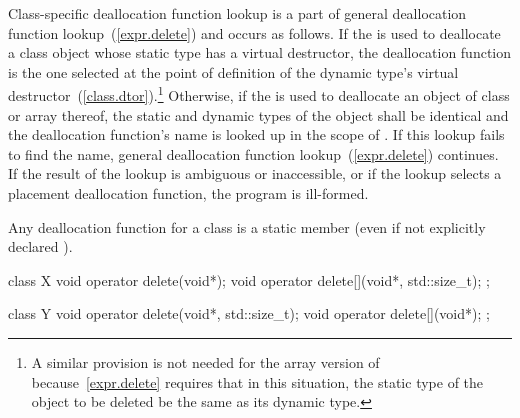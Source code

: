 \pnum
Class-specific deallocation function lookup is a part of general deallocation
function lookup~(\ref{expr.delete}) and occurs as follows.
If the 
is used to deallocate a class object whose static type has a virtual
destructor, the deallocation function is the one selected at the point
of definition of the dynamic type's virtual
destructor~(\ref{class.dtor}).\footnote{A similar provision is not needed for
the array version of   because~\ref{expr.delete}
requires that in this situation, the static type of the object to be deleted be
the same as its dynamic type.
}
Otherwise, if the
is used to deallocate an object of class
or array thereof, the static and dynamic types of the object shall be
identical and the deallocation function's name is looked up in the scope of
.
If this lookup fails to find the name, general deallocation function
lookup~(\ref{expr.delete}) continues.
If the result of the lookup is ambiguous or inaccessible, or if the lookup
selects a placement deallocation function, the program is ill-formed.

\pnum
{}%
Any deallocation function for a class
is a static member (even if not explicitly declared
).
%
\begin{example}

\begin{codeblock}
class X {
  void operator delete(void*);
  void operator delete[](void*, std::size_t);
};

class Y {
  void operator delete(void*, std::size_t);
  void operator delete[](void*);
};
\end{codeblock}
\end{example}

